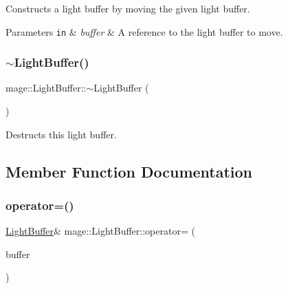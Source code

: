 Constructs a light buffer by moving the given light buffer.


\begin{DoxyParams}[1]{Parameters}
\mbox{\tt in}  & {\em buffer} & A reference to the light buffer to move. \\
\hline
\end{DoxyParams}
\hypertarget{structmage_1_1_light_buffer_a0dc88c8ad1721b4b545c65c26c2fec69}{}\label{structmage_1_1_light_buffer_a0dc88c8ad1721b4b545c65c26c2fec69} 
\subsubsection{\texorpdfstring{$\sim$\+Light\+Buffer()}{~LightBuffer()}}
{\footnotesize\ttfamily mage\+::\+Light\+Buffer\+::$\sim$\+Light\+Buffer (\begin{DoxyParamCaption}{ }\end{DoxyParamCaption})\hspace{0.3cm}{\ttfamily [default]}}

Destructs this light buffer. 

\subsection{Member Function Documentation}
\hypertarget{structmage_1_1_light_buffer_ae3560a8dcda61fb02b86a370cd689e15}{}\label{structmage_1_1_light_buffer_ae3560a8dcda61fb02b86a370cd689e15} 
\subsubsection{\texorpdfstring{operator=()}{operator=()}\hspace{0.1cm}{\footnotesize\ttfamily [1/2]}}
{\footnotesize\ttfamily \hyperlink{structmage_1_1_light_buffer}{Light\+Buffer}\& mage\+::\+Light\+Buffer\+::operator= (\begin{DoxyParamCaption}\item[{const \hyperlink{structmage_1_1_light_buffer}{Light\+Buffer} \&}]{buffer }\end{DoxyParamCaption})\hspace{0.3cm}{\ttfamily [default]}}

